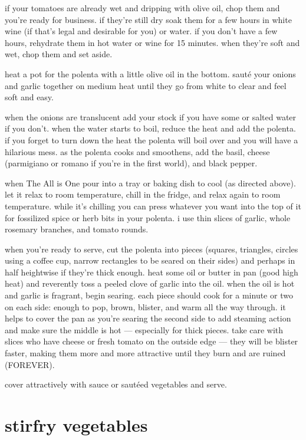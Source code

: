if your tomatoes are already wet and dripping with olive oil, chop them and 
you're ready for business. if they're still dry soak them for a few hours in 
white wine (if that's legal and desirable for you) or water. if you don't have 
a few hours, rehydrate them in hot water or wine for 15 minutes. when they're 
soft and wet, chop them and set aside.

heat a pot for the polenta with a little olive oil in the bottom. saut\'{e} 
your onions and garlic together on medium heat until they go from white to 
clear and feel soft and easy.

when the onions are translucent add your stock if you have some or salted 
water if you don't. when the water starts to boil, reduce the heat and add the 
polenta. if you forget to turn down the heat the polenta will boil over and 
you will have a hilarious mess. as the polenta cooks and smoothens, add the 
basil, cheese (parmigiano or romano if you're in the first world), and black 
pepper.

when The All is One pour into a tray or baking dish to cool (as directed 
above). let it relax to room temperature, chill in the fridge, and relax again 
to room temperature. while it's chilling you can press whatever you want into 
the top of it for fossilized spice or herb bits in your polenta. i use thin 
slices of garlic, whole rosemary branches, and tomato rounds.

when you're ready to serve, cut the polenta into pieces (squares, triangles, 
circles using a coffee cup, narrow rectangles to be seared on their sides) 
and perhaps in half heightwise if they're thick enough. heat some oil or 
butter in pan (good high heat) and reverently toss a peeled clove of garlic 
into the oil. when the oil is hot and garlic is fragrant, begin searing. each 
piece should cook for a minute or two on each side: enough to pop, brown, 
blister, and warm all the way through. it helps to cover the pan as you're 
searing the second side to add steaming action and make sure the middle is 
hot --- especially for thick pieces. take care with slices who have cheese or 
fresh tomato on the outside edge --- they will be blister faster, making them 
more and more attractive until they burn and are ruined (FOREVER).

cover attractively with sauce or saut\'{e}ed vegetables and serve.

\section{stirfry vegetables}

